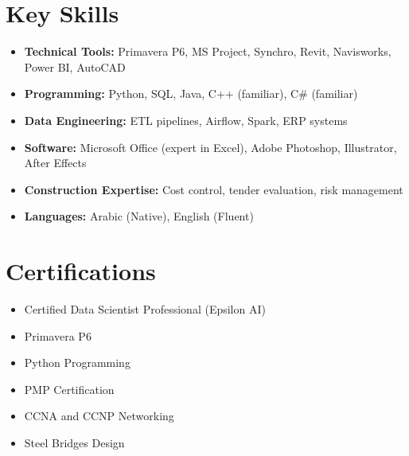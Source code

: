 \documentclass[10pt, letterpaper]{article}
\begin{document}
    \section{Key Skills}
    \begin{itemize}[leftmargin=*]
        \item \textbf{Technical Tools:} Primavera P6, MS Project, Synchro, Revit, Navisworks, Power BI, AutoCAD
        \item \textbf{Programming:} Python, SQL, Java, C++ (familiar), C\# (familiar)
        \item \textbf{Data Engineering:} ETL pipelines, Airflow, Spark, ERP systems
        \item \textbf{Software:} Microsoft Office (expert in Excel), Adobe Photoshop, Illustrator, After Effects
        \item \textbf{Construction Expertise:} Cost control, tender evaluation, risk management
        \item \textbf{Languages:} Arabic (Native), English (Fluent)
    \end{itemize}
    
    \section{Certifications}
    \begin{itemize}[leftmargin=*]
        \item Certified Data Scientist Professional (Epsilon AI)
        \item Primavera P6
        \item Python Programming
        \item PMP Certification
        \item CCNA and CCNP Networking
        \item Steel Bridges Design
    \end{itemize}
\end{document}
